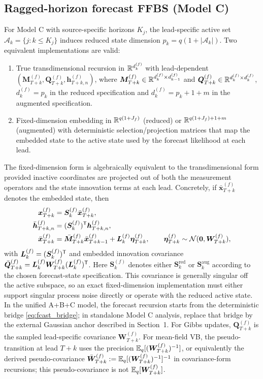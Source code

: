 \subsection{Ragged-horizon forecast FFBS (Model C)}
For Model C with source-specific horizons $K_j$, the lead-specific active set
$\mathcal A_k=\{j:k\le K_j\}$ induces reduced state dimension $p_k=q(1+|\mathcal A_k|)$.
Two equivalent implementations are valid:
\begin{enumerate}
\item True transdimensional recursion in $\mathbb{R}^{d_k^{(f)}}$ with lead-dependent
      $(\bm M_{T+k}^{(f)},\bm Q_{T+k}^{(f)},\bm h_{T+k,n}^{(f)})$, where
      $\bm M_{T+k}^{(f)}\in\mathbb{R}^{d_k^{(f)}\times d_{k-1}^{(f)}}$ and
      $\bm Q_{T+k}^{(f)}\in\mathbb{R}^{d_k^{(f)}\times d_k^{(f)}}$,
      $d_k^{(f)}=p_k$ in the reduced specification and $d_k^{(f)}=p_k+1+m$
      in the augmented specification.
\item Fixed-dimension embedding in $\mathbb{R}^{q(1+J_f)}$ (reduced) or
      $\mathbb{R}^{q(1+J_f)+1+m}$ (augmented) with deterministic selection/projection
      matrices that map the embedded state to the active state used by the
      forecast likelihood at each lead.
\end{enumerate}
The fixed-dimension form is algebraically equivalent to the transdimensional form
provided inactive coordinates are projected out of both the measurement operators and
the state innovation terms at each lead.
Concretely, if $\bar{\bm x}_{T+k}^{(f)}$ denotes the embedded state, then
\begin{align}
\bm x_{T+k}^{(f)} &= \bm S_k^{(f)}\bar{\bm x}_{T+k}^{(f)}, \\
\bar{\bm h}_{T+k,n}^{(f)} &= (\bm S_k^{(f)})^{\mathsf{T}} \bm h_{T+k,n}^{(f)}, \\
\bar{\bm x}_{T+k}^{(f)} &= \bar{\bm M}_{T+k}^{(f)}\bar{\bm x}_{T+k-1}^{(f)} + \bm L_k^{(f)}\bm\eta_{T+k}^{(f)},
\qquad
\bm\eta_{T+k}^{(f)}\sim\mathcal{N}(\bm 0,\bm W_{T+k}^{(f)}),
\end{align}
with $\bm L_k^{(f)}=(\bm S_k^{(f)})^{\mathsf{T}}$ and embedded innovation covariance
$\bar{\bm Q}_{T+k}^{(f)}=\bm L_k^{(f)}\bm W_{T+k}^{(f)}(\bm L_k^{(f)})^{\mathsf{T}}$.
Here $\bm S_k^{(f)}$ denotes either $\bm S_k^{\mathrm{red}}$ or $\bm S_k^{\mathrm{aug}}$
according to the chosen forecast-state specification.
This covariance is generally singular off the active subspace, so an exact fixed-dimension
implementation must either support singular process noise directly or operate with the
reduced active state.
In the unified A+B+C model, the forecast recursion starts from the deterministic bridge
\eqref{eq:fcast_bridge}; in standalone Model C analysis, replace that bridge by the external
Gaussian anchor described in Section~1.
For Gibbs updates, $\bm Q_{T+k}^{(f)}$ is the sampled lead-specific covariance
$\bm W_{T+k}^{(f)}$.
For mean-field VB, the pseudo-transition at lead $T+k$ uses the precision
$\mathbb{E}_q[(\bm W_{T+k}^{(f)})^{-1}]$, or equivalently the derived pseudo-covariance
$\bar{\bm W}_{T+k}^{(f)}:=\mathbb{E}_q[(\bm W_{T+k}^{(f)})^{-1}]^{-1}$ in covariance-form
recursions; this pseudo-covariance is not $\mathbb{E}_q[\bm W_{T+k}^{(f)}]$.
